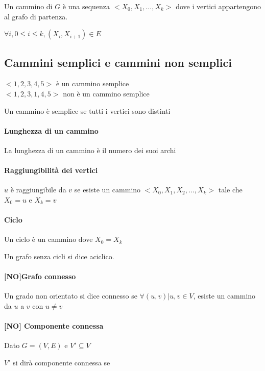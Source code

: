 {Un cammino di $G$ è una sequenza $<X_0,X_1,\ldots,X_k>$ dove i vertici appartengono al grafo di partenza.}

$\forall i,0\leq i\leq k,(X_i,X_{i+1})\in E$

\subsection{Cammini semplici e cammini non semplici}

$<1,2,3,4,5>$ è un cammino semplice\\
$<1,2,3,1,4,5>$ non è un cammino semplice

{Un cammino è semplice se tutti i vertici sono distinti}

\paragraph{Lunghezza di un cammino}

{La lunghezza di un cammino è il numero dei suoi archi}

\paragraph{Raggiungibilità dei vertici}

$u$ è raggiungibile da $v$ se esiste un cammino $<X_0,X_1,X_2,\ldots,X_k>$ tale che $X_0 = u$ e $X_k = v$

\paragraph{Ciclo}

{Un ciclo è un cammino dove $X_0 = X_k$}

{Un grafo senza cicli si dice aciclico.}

\paragraph{{[}NO{]}Grafo connesso}

{Un grado non orientato si dice connesso se $\forall (u,v) | u,v \in V$, esiste un cammino da $u$ a $v$ con $u\neq v$}

\paragraph{{[}NO{]} Componente connessa}

{Dato $G=(V,E)$ e $V' \subseteq V$}

{$V'$ si dirà componente connessa se }

